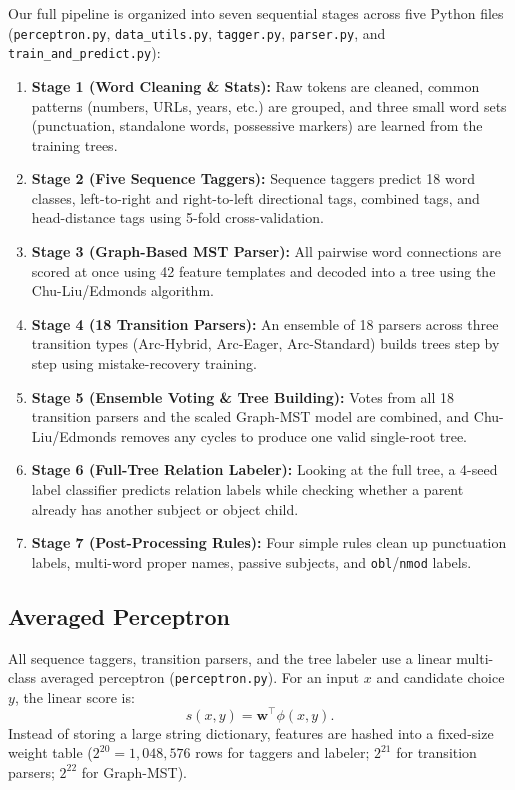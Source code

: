 \documentclass[11pt,a4paper]{article}
\begin{document}
Our full pipeline is organized into seven sequential stages across five Python files (\texttt{perceptron.py}, \texttt{data\_utils.py}, \texttt{tagger.py}, \texttt{parser.py}, and \texttt{train\_and\_predict.py}):
\begin{enumerate}[noitemsep]
    \item \textbf{Stage 1 (Word Cleaning \& Stats):} Raw tokens are cleaned, common patterns (numbers, URLs, years, etc.) are grouped, and three small word sets (punctuation, standalone words, possessive markers) are learned from the training trees.
    \item \textbf{Stage 2 (Five Sequence Taggers):} Sequence taggers predict 18 word classes, left-to-right and right-to-left directional tags, combined tags, and head-distance tags using 5-fold cross-validation.
    \item \textbf{Stage 3 (Graph-Based MST Parser):} All pairwise word connections are scored at once using 42 feature templates and decoded into a tree using the Chu-Liu/Edmonds algorithm.
    \item \textbf{Stage 4 (18 Transition Parsers):} An ensemble of 18 parsers across three transition types (Arc-Hybrid, Arc-Eager, Arc-Standard) builds trees step by step using mistake-recovery training.
    \item \textbf{Stage 5 (Ensemble Voting \& Tree Building):} Votes from all 18 transition parsers and the scaled Graph-MST model are combined, and Chu-Liu/Edmonds removes any cycles to produce one valid single-root tree.
    \item \textbf{Stage 6 (Full-Tree Relation Labeler):} Looking at the full tree, a 4-seed label classifier predicts relation labels while checking whether a parent already has another subject or object child.
    \item \textbf{Stage 7 (Post-Processing Rules):} Four simple rules clean up punctuation labels, multi-word proper names, passive subjects, and \texttt{obl}/\texttt{nmod} labels.
\end{enumerate}

\subsection{Averaged Perceptron}
All sequence taggers, transition parsers, and the tree labeler use a linear multi-class averaged perceptron (\texttt{perceptron.py}). For an input $x$ and candidate choice $y$, the linear score is:
\begin{equation}
s(x, y) = \mathbf{w}^\top \phi(x, y).
\end{equation}
Instead of storing a large string dictionary, features are hashed into a fixed-size weight table ($2^{20} = 1,048,576$ rows for taggers and labeler; $2^{21}$ for transition parsers; $2^{22}$ for Graph-MST).
\end{document}
